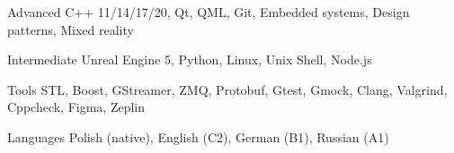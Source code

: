 

\begin{cvskills}

  \cvskill
    {Advanced} %
    {C++ 11/14/17/20, Qt, QML, Git, Embedded systems, Design patterns, Mixed reality} %

  \cvskill
    {Intermediate} %
    {Unreal Engine 5, Python, Linux, Unix Shell, Node.js} %

  \cvskill
    {Tools} %
    {STL, Boost, GStreamer, ZMQ, Protobuf, Gtest, Gmock, Clang, Valgrind, Cppcheck, Figma, Zeplin} %


  \cvskill
    {Languages} %
    {Polish (native), English (C2), German (B1), Russian (A1)} %

\end{cvskills}
